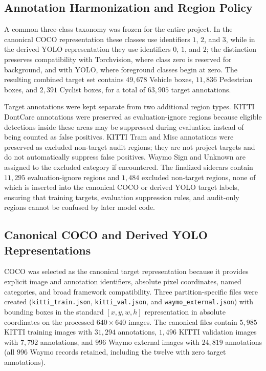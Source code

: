 \subsection{Annotation Harmonization and Region Policy}
\label{sec:methodology_regions}

A common three-class taxonomy was frozen for the entire project. In the canonical COCO
representation these classes use identifiers $1$, $2$, and $3$, while in the derived YOLO
representation they use identifiers $0$, $1$, and $2$; the distinction preserves
compatibility with Torchvision, where class zero is reserved for background, and with
YOLO, where foreground classes begin at zero. The resulting combined target set contains
$49{,}678$ Vehicle boxes, $11{,}836$ Pedestrian boxes, and $2{,}391$ Cyclist boxes, for a
total of $63{,}905$ target annotations.

Target annotations were kept separate from two additional region types. KITTI DontCare
annotations were preserved as evaluation-ignore regions because eligible detections inside
these areas may be suppressed during evaluation instead of being counted as false
positives. KITTI Tram and Misc annotations were preserved as excluded non-target audit
regions; they are not project targets and do not automatically suppress false positives.
Waymo Sign and Unknown are assigned to the excluded category if encountered. The finalized
sidecars contain $11{,}295$ evaluation-ignore regions and $1{,}484$ excluded non-target
regions, none of which is inserted into the canonical COCO or derived YOLO target labels,
ensuring that training targets, evaluation suppression rules, and audit-only regions cannot
be confused by later model code.

\subsection{Canonical COCO and Derived YOLO Representations}
\label{sec:methodology_representations}

COCO was selected as the canonical target representation because it provides explicit image
and annotation identifiers, absolute pixel coordinates, named categories, and broad
framework compatibility. Three partition-specific files were created
(\texttt{kitti\_train.json}, \texttt{kitti\_val.json}, and
\texttt{waymo\_external.json}) with bounding boxes in the standard $[x, y, w, h]$
representation in absolute coordinates on the processed $640\times640$ images. The
canonical files contain $5{,}985$ KITTI training images with $31{,}294$ annotations,
$1{,}496$ KITTI validation images with $7{,}792$ annotations, and $996$ Waymo external
images with $24{,}819$ annotations (all $996$ Waymo records retained, including the twelve
with zero target annotations).

